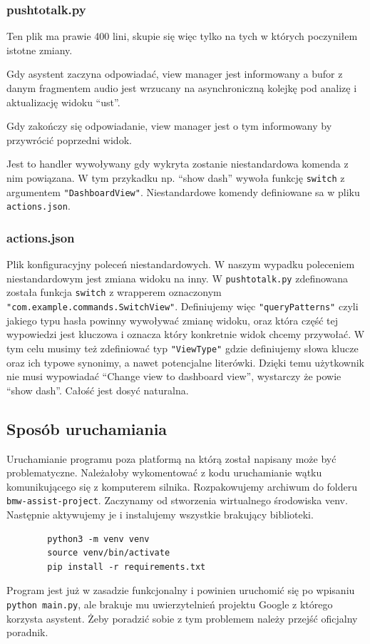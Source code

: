 \documentclass[declaration,shortabstract, inz]{iithesis}
\begin{document}
\subsubsection{pushtotalk.py}
Ten plik ma prawie 400 lini, skupie się więc tylko na tych w których poczyniłem istotne zmiany.

    Gdy asystent zaczyna odpowiadać, view manager jest informowany a bufor z danym fragmentem audio jest wrzucany na asynchroniczną kolejkę pod analizę i aktualizację widoku ``ust''.

    Gdy zakończy się odpowiadanie, view manager jest o tym informowany by przywrócić poprzedni widok.

    Jest to handler wywoływany gdy wykryta zostanie niestandardowa komenda z nim powiązana. W tym przykadku np. ``show dash'' wywoła funkcję \texttt{switch} z argumentem \texttt{"DashboardView"}. Niestandardowe komendy definiowane sa w pliku \texttt{actions.json}.



\subsubsection{actions.json}
% 
    Plik konfiguracyjny poleceń niestandardowych. W naszym wypadku poleceniem niestandardowym jest zmiana widoku na inny. W \texttt{pushtotalk.py} zdefinowana została funkcja \texttt{switch} z wrapperem oznaczonym \texttt{"com.example.commands.SwitchView"}. Definiujemy więc \texttt{"queryPatterns"} czyli jakiego typu hasła powinny wywoływać zmianę widoku, oraz która część tej wypowiedzi jest kluczowa i oznacza który konkretnie widok chcemy przywołać. W tym celu musimy też zdefiniować typ \texttt{"ViewType"} gdzie definiujemy słowa klucze oraz ich typowe synonimy, a nawet potencjalne literówki. Dzięki temu użytkownik nie musi wypowiadać ``Change view to dashboard view'', wystarczy że powie ``show dash''. Całość jest dosyć naturalna.
    
\subsection{Sposób uruchamiania}
    Uruchamianie programu poza platformą na którą został napisany może być problematyczne.
    Należałoby wykomentować z kodu uruchamianie wątku komunikującego się z komputerem silnika.
    Rozpakowujemy archiwum do folderu \texttt{bmw-assist-project}. Zaczynamy od stworzenia wirtualnego środowiska venv. Następnie aktywujemy je i instalujemy wszystkie brakujący biblioteki.
    \begin{verbatim}
        python3 -m venv venv
        source venv/bin/activate
        pip install -r requirements.txt
    \end{verbatim}
    Program jest już w zasadzie funkcjonalny i powinien uruchomić się po wpisaniu \texttt{python main.py}, ale brakuje mu uwierzytelnień projektu Google z którego korzysta asystent. Żeby poradzić sobie z tym problemem należy przejść oficjalny poradnik\cite{samouczek}.
    
\end{document}
